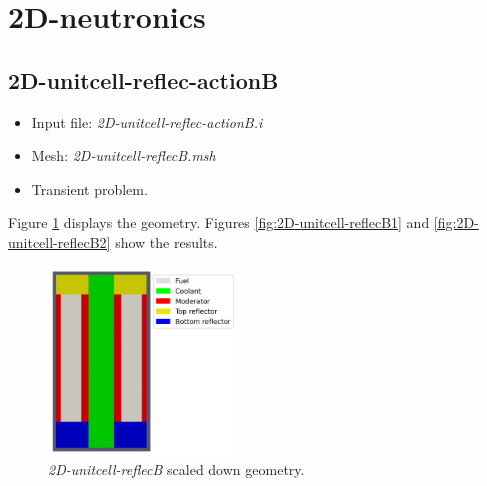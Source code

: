 \documentclass[11pt,letterpaper]{article}
\begin{document}
\section{2D-neutronics}

\subsection{2D-unitcell-reflec-actionB}

	\begin{itemize}
		\item Input file: \textit{2D-unitcell-reflec-actionB.i}
		\item Mesh: \textit{2D-unitcell-reflecB.msh}
		\item Transient problem.
	\end{itemize}

Figure \ref{fig:2D-unitcell-reflecB} displays the geometry.
Figures \ref{fig:2D-unitcell-reflecB1} and \ref{fig:2D-unitcell-reflecB2} show the results.

	\begin{figure}[htbp!]
		\centering
		\includegraphics[height=5cm]{2D-unitcell-reflecB-mesh}
		\caption{\textit{2D-unitcell-reflecB} scaled down geometry.}
		\label{fig:2D-unitcell-reflecB}
	\end{figure}
\end{document}
